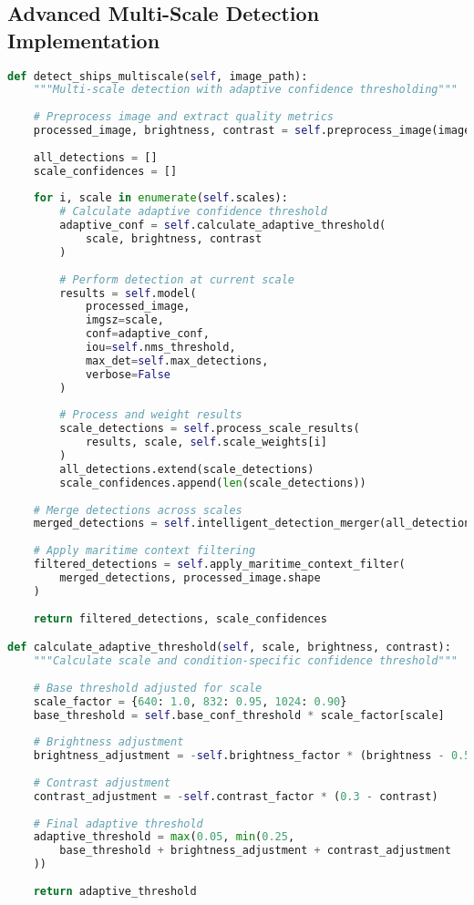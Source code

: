 \documentclass[12pt,a4paper]{report}
\begin{document}
\subsection{Advanced Multi-Scale Detection Implementation}
\begin{lstlisting}[language=Python, caption=Enhanced Multi-Scale Detection Pipeline]
def detect_ships_multiscale(self, image_path):
    """Multi-scale detection with adaptive confidence thresholding"""
    
    # Preprocess image and extract quality metrics
    processed_image, brightness, contrast = self.preprocess_image(image_path)
    
    all_detections = []
    scale_confidences = []
    
    for i, scale in enumerate(self.scales):
        # Calculate adaptive confidence threshold
        adaptive_conf = self.calculate_adaptive_threshold(
            scale, brightness, contrast
        )
        
        # Perform detection at current scale
        results = self.model(
            processed_image,
            imgsz=scale,
            conf=adaptive_conf,
            iou=self.nms_threshold,
            max_det=self.max_detections,
            verbose=False
        )
        
        # Process and weight results
        scale_detections = self.process_scale_results(
            results, scale, self.scale_weights[i]
        )
        all_detections.extend(scale_detections)
        scale_confidences.append(len(scale_detections))
    
    # Merge detections across scales
    merged_detections = self.intelligent_detection_merger(all_detections)
    
    # Apply maritime context filtering
    filtered_detections = self.apply_maritime_context_filter(
        merged_detections, processed_image.shape
    )
    
    return filtered_detections, scale_confidences

def calculate_adaptive_threshold(self, scale, brightness, contrast):
    """Calculate scale and condition-specific confidence threshold"""
    
    # Base threshold adjusted for scale
    scale_factor = {640: 1.0, 832: 0.95, 1024: 0.90}
    base_threshold = self.base_conf_threshold * scale_factor[scale]
    
    # Brightness adjustment
    brightness_adjustment = -self.brightness_factor * (brightness - 0.5)
    
    # Contrast adjustment  
    contrast_adjustment = -self.contrast_factor * (0.3 - contrast)
    
    # Final adaptive threshold
    adaptive_threshold = max(0.05, min(0.25, 
        base_threshold + brightness_adjustment + contrast_adjustment
    ))
    
    return adaptive_threshold
\end{lstlisting}
\end{document}
